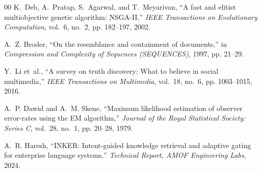 \documentclass[journal,10pt,twocolumn]{IEEEtran}
\begin{document}
\begin{thebibliography}{00}
K.~Deb, A.~Pratap, S.~Agarwal, and T.~Meyarivan, ``A fast and elitist multiobjective genetic algorithm: {NSGA-II},'' \textit{IEEE Transactions on Evolutionary Computation}, vol.~6, no.~2, pp. 182--197, 2002.

A.~Z. Broder, ``On the resemblance and containment of documents,'' in \textit{Compression and Complexity of Sequences (SEQUENCES)}, 1997, pp. 21--29.

Y.~Li et~al., ``A survey on truth discovery: What to believe in social multimedia,'' \textit{IEEE Transactions on Multimedia}, vol.~18, no.~6, pp. 1003--1015, 2016.

A.~P. Dawid and A.~M. Skene, ``Maximum likelihood estimation of observer error-rates using the {EM} algorithm,'' \textit{Journal of the Royal Statistical Society: Series C}, vol.~28, no.~1, pp. 20--28, 1979.

A.~R. Haresh, ``{INKER}: Intent-guided knowledge retrieval and adaptive gating for enterprise language systems,'' \textit{Technical Report, AMOF Engineering Labs}, 2024.

\end{thebibliography}
\end{document}
